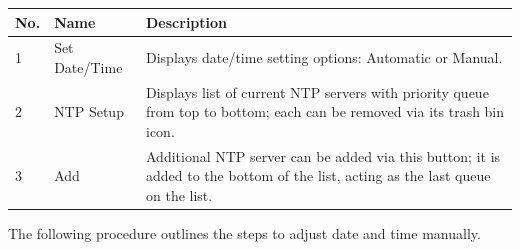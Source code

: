 \begin{longtable}[]{@{}|l|l|l|@{}}
\toprule
\rowcolor{brown}\begin{minipage}[b]{0.04\columnwidth}\raggedright
{\bf{No.}}\strut
\end{minipage} & \begin{minipage}[b]{0.23\columnwidth}\raggedright
{\bf{Name}}\strut
\end{minipage} & \begin{minipage}[b]{0.65\columnwidth}\raggedright
{\bf{Description}}\strut
\end{minipage}\tabularnewline
\midrule
\endhead
\begin{minipage}[t]{0.04\columnwidth}\raggedright
1\strut
\end{minipage} & \begin{minipage}[t]{0.23\columnwidth}\raggedright
Set Date/Time\strut
\end{minipage} & \begin{minipage}[t]{0.65\columnwidth}\raggedright
Displays date/time setting options: Automatic or Manual.\strut
\end{minipage}\tabularnewline
\begin{minipage}[t]{0.04\columnwidth}\raggedright
2\strut
\end{minipage} & \begin{minipage}[t]{0.23\columnwidth}\raggedright
NTP Setup\strut
\end{minipage} & \begin{minipage}[t]{0.65\columnwidth}\raggedright
Displays list of current NTP servers with priority queue from top to
bottom; each can be removed via its trash bin icon.\strut
\end{minipage}\tabularnewline
\begin{minipage}[t]{0.04\columnwidth}\raggedright
3\strut
\end{minipage} & \begin{minipage}[t]{0.23\columnwidth}\raggedright
Add\strut
\end{minipage} & \begin{minipage}[t]{0.65\columnwidth}\raggedright
Additional NTP server can be added via this button; it is added to the
bottom of the list, acting as the last queue on the list.\strut
\end{minipage}\tabularnewline
\bottomrule
\end{longtable}

The following procedure outlines the steps to adjust date and time
manually.

